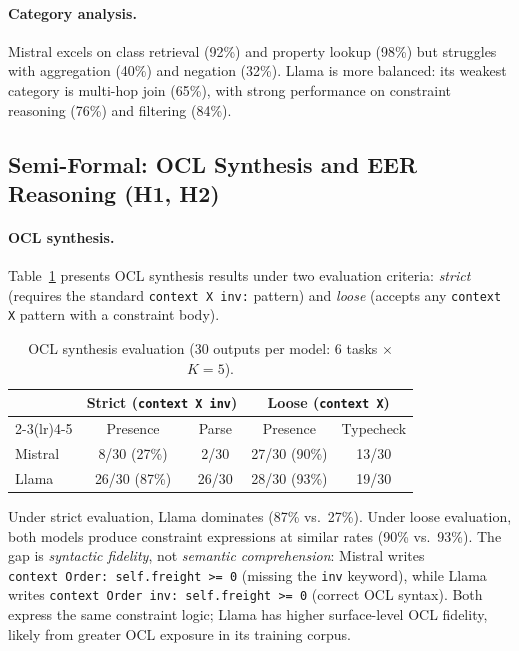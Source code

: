\documentclass[runningheads]{llncs}
\begin{document}
\paragraph{Category analysis.}
Mistral excels on class retrieval (92\%) and property lookup (98\%) but struggles with aggregation (40\%) and negation (32\%). Llama is more balanced: its weakest category is multi-hop join (65\%), with strong performance on constraint reasoning (76\%) and filtering (84\%).

\subsection{Semi-Formal: OCL Synthesis and EER Reasoning (H1, H2)}

\paragraph{OCL synthesis.}
Table~\ref{tab:ocl} presents OCL synthesis results under two evaluation criteria: \emph{strict} (requires the standard \texttt{context X inv:} pattern) and \emph{loose} (accepts any \texttt{context X} pattern with a constraint body).

\begin{table}[h]
\centering
\caption{OCL synthesis evaluation (30 outputs per model: 6 tasks $\times$ $K\!=\!5$).}
\label{tab:ocl}
\begin{tabular}{lcccc}
\toprule
& \multicolumn{2}{c}{Strict (\texttt{context X inv})} & \multicolumn{2}{c}{Loose (\texttt{context X})} \\
\cmidrule(lr){2-3}\cmidrule(lr){4-5}
& Presence & Parse & Presence & Typecheck \\
\midrule
Mistral & 8/30 (27\%) & 2/30 & 27/30 (90\%) & 13/30 \\
Llama   & 26/30 (87\%) & 26/30 & 28/30 (93\%) & 19/30 \\
\bottomrule
\end{tabular}
\end{table}

Under strict evaluation, Llama dominates (87\% vs.\ 27\%). Under loose evaluation, both models produce constraint expressions at similar rates (90\% vs.\ 93\%). The gap is \emph{syntactic fidelity}, not \emph{semantic comprehension}: Mistral writes \texttt{context~Order:~self.freight~>=~0} (missing the \texttt{inv} keyword), while Llama writes \texttt{context~Order~inv:~self.freight~>=~0} (correct OCL syntax). Both express the same constraint logic; Llama has higher surface-level OCL fidelity, likely from greater OCL exposure in its training corpus.
\end{document}
